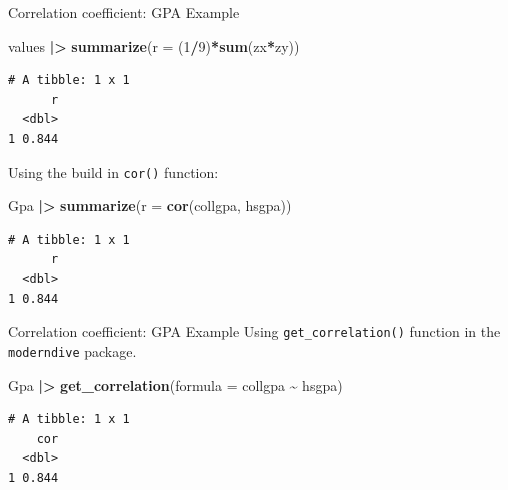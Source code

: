 \documentclass[
  ignorenonframetext,
]{beamer}
\newenvironment{Shaded}{\begin{snugshade}}{\end{snugshade}}
\newcommand{\AttributeTok}[1]{\textcolor[rgb]{0.13,0.29,0.53}{#1}}
\newcommand{\DecValTok}[1]{\textcolor[rgb]{0.00,0.00,0.81}{#1}}
\newcommand{\FunctionTok}[1]{\textcolor[rgb]{0.13,0.29,0.53}{\textbf{#1}}}
\newcommand{\NormalTok}[1]{#1}
\newcommand{\SpecialCharTok}[1]{\textcolor[rgb]{0.81,0.36,0.00}{\textbf{#1}}}
\begin{document}
\begin{frame}[fragile]{Correlation coefficient: GPA Example}
\protect\hypertarget{correlation-coefficient-gpa-example-1}{}
\normalsize

\begin{Shaded}
\begin{Highlighting}[]
\NormalTok{values }\SpecialCharTok{|\textgreater{}} 
  \FunctionTok{summarize}\NormalTok{(}\AttributeTok{r =}\NormalTok{ (}\DecValTok{1}\SpecialCharTok{/}\DecValTok{9}\NormalTok{)}\SpecialCharTok{*}\FunctionTok{sum}\NormalTok{(zx}\SpecialCharTok{*}\NormalTok{zy))}
\end{Highlighting}
\end{Shaded}

\begin{verbatim}
# A tibble: 1 x 1
      r
  <dbl>
1 0.844
\end{verbatim}

\normalsize

Using the build in \texttt{cor()} function:

\normalsize

\begin{Shaded}
\begin{Highlighting}[]
\NormalTok{Gpa }\SpecialCharTok{|\textgreater{}} 
  \FunctionTok{summarize}\NormalTok{(}\AttributeTok{r =} \FunctionTok{cor}\NormalTok{(collgpa, hsgpa))}
\end{Highlighting}
\end{Shaded}

\begin{verbatim}
# A tibble: 1 x 1
      r
  <dbl>
1 0.844
\end{verbatim}

\normalsize
\end{frame}

\begin{frame}[fragile]{Correlation coefficient: GPA Example}
\protect\hypertarget{correlation-coefficient-gpa-example-2}{}
Using \texttt{get\_correlation()} function in the \texttt{moderndive}
package.

\normalsize

\begin{Shaded}
\begin{Highlighting}[]
\NormalTok{Gpa }\SpecialCharTok{|\textgreater{}} 
  \FunctionTok{get\_correlation}\NormalTok{(}\AttributeTok{formula =}\NormalTok{ collgpa }\SpecialCharTok{\textasciitilde{}}\NormalTok{ hsgpa)}
\end{Highlighting}
\end{Shaded}

\begin{verbatim}
# A tibble: 1 x 1
    cor
  <dbl>
1 0.844
\end{verbatim}

\normalsize
\end{frame}
\end{document}
